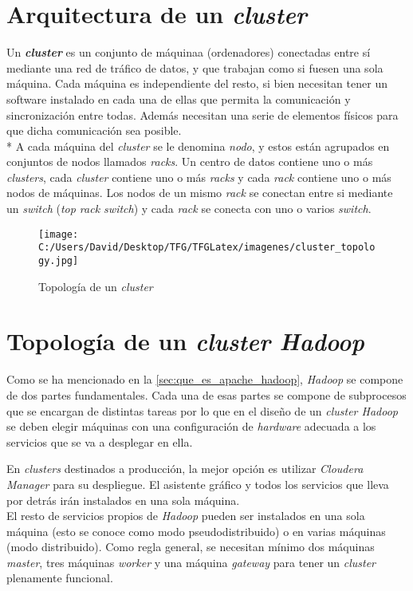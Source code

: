 \clearpage

\section{Arquitectura de un \textit{cluster}}\label{sec:arquitectura_cluster}
Un \textbf{\textit{cluster}} es un conjunto de máquinaa (ordenadores) conectadas entre sí mediante 
una red de tráfico de datos, y que trabajan como si fuesen una sola máquina.
Cada máquina es independiente del resto, si bien necesitan tener un software instalado en cada una de ellas
que permita la comunicación y sincronización entre todas. Además necesitan una serie de elementos
físicos para que dicha comunicación sea posible.\\*
A cada máquina del \textit{cluster} se le denomina \textit{nodo}, y estos están agrupados en 
conjuntos de nodos llamados \textit{racks}.
Un centro de datos contiene uno o más \textit{clusters}, cada \textit{cluster} contiene 
uno o más \textit{racks} y cada \textit{rack} contiene uno o más nodos de máquinas. 
Los nodos de un mismo \textit{rack} se conectan entre si mediante un \textit{switch} 
(\textit{top rack switch}) y cada \textit{rack} se conecta con uno o varios \textit{switch}.

\begin{figure}[h]
  \centering
  \texttt{[image: C:/Users/David/Desktop/TFG/TFGLatex/imagenes/cluster\_topology.jpg]}
  \caption[Topología de un \textit{cluster}]{Topología de un \textit{cluster}}
  \label{cluster_topology}
\end{figure}

\clearpage


\section{Topología de un \textit{cluster Hadoop}}
Como se ha mencionado en la \autoref{sec:que_es_apache_hadoop}, \textit{Hadoop} se compone de dos partes 
fundamentales. Cada una de esas partes se compone de subprocesos que se encargan de distintas tareas por lo que
en el diseño de un \textit{cluster Hadoop} se deben elegir máquinas con una configuración de \textit{hardware} 
adecuada a los servicios que se va a desplegar en ella.

En \textit{clusters} destinados a producción, la mejor opción es utilizar \textit{Cloudera Manager} para
su despliegue. El asistente gráfico y todos los servicios que lleva por detrás irán instalados en una
sola máquina. \\
El resto de servicios propios de \textit{Hadoop} pueden ser instalados en una sola máquina (esto se conoce 
como modo pseudodistribuido) o en varias máquinas (modo distribuido).
Como regla general, se necesitan mínimo dos máquinas \textit{master}, tres máquinas \textit{worker} y una
máquina \textit{gateway} para tener un \textit{cluster} plenamente funcional.
\newline

